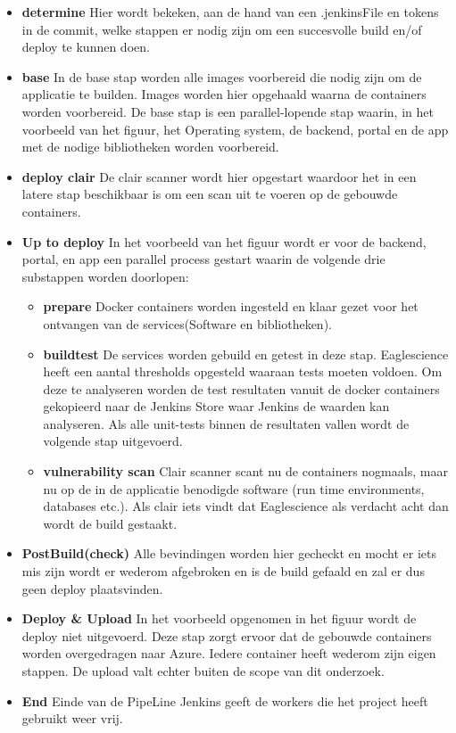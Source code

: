\begin{itemize}
    \item \textbf{determine} Hier wordt bekeken, aan de hand van een .jenkinsFile en tokens in de commit, welke stappen er nodig zijn om een succesvolle build en/of deploy te kunnen doen.
    \item \textbf{base} In de base stap worden alle images voorbereid die nodig zijn om de applicatie te builden. Images worden hier opgehaald waarna de containers worden voorbereid. De base stap is een parallel-lopende stap waarin, in het voorbeeld van het figuur, het Operating system, de backend, portal en de app  met de nodige bibliotheken worden voorbereid.
    \item \textbf{deploy clair} De clair scanner wordt hier opgestart waardoor het in een latere stap beschikbaar is om een scan uit te voeren op de gebouwde containers.
    \item \textbf{Up to deploy}
    In het voorbeeld van het figuur wordt er voor de backend, portal, en app een parallel process gestart waarin de volgende drie substappen worden doorlopen:
    \begin{itemize}
        \item \textbf{prepare} Docker containers worden ingesteld en klaar gezet voor het ontvangen van de services(Software en bibliotheken).
        \item \textbf{buildtest} De services worden gebuild en getest in deze stap. Eaglescience heeft een aantal thresholds opgesteld waaraan tests moeten voldoen. Om deze te analyseren worden de test resultaten vanuit de docker containers gekopieerd naar de Jenkins Store waar Jenkins de waarden kan analyseren. Als alle unit-tests binnen de resultaten vallen wordt de volgende stap uitgevoerd.
        \item \textbf{vulnerability scan} Clair scanner scant nu de containers nogmaals, maar nu op de in de applicatie benodigde software (run time environments, databases etc.). Als clair iets vindt dat Eaglescience als verdacht acht dan wordt de build gestaakt.
    \end{itemize}
    \item \textbf{PostBuild(check)}
    Alle bevindingen worden hier gecheckt en mocht er iets mis zijn wordt er wederom afgebroken en is de build gefaald en zal er dus geen deploy plaatsvinden.
    \item \textbf{Deploy \& Upload}
    In het voorbeeld opgenomen in het figuur wordt de deploy niet uitgevoerd. Deze stap zorgt ervoor dat de gebouwde containers worden overgedragen naar Azure. Iedere container heeft wederom zijn eigen stappen. De upload valt echter buiten de scope van dit onderzoek.
    \item \textbf{End}
    Einde van de PipeLine Jenkins geeft de workers die het project heeft gebruikt weer vrij.
\end{itemize}


